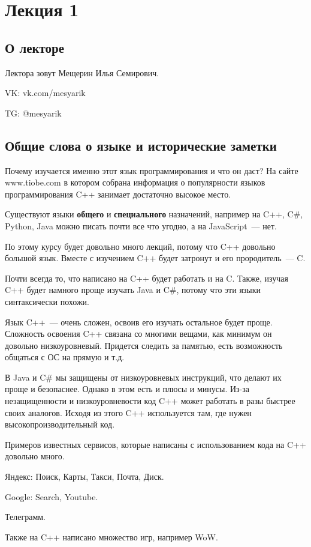 \section{Лекция 1}

\subsection*{О лекторе}
Лектора зовут Мещерин Илья Семирович.

VK: vk.com/mesyarik

TG: @mesyarik

\subsection{Общие слова о языке и исторические заметки}
Почему изучается именно этот язык программирования и что он даст?
На сайте www.tiobe.com в котором собрана информация о популярности языков программирования C++ занимает достаточно высокое место.

Существуют языки \textbf{общего} и \textbf{специального} назначений,
например на C++, C\#, Python, Java можно писать почти все что угодно, а на JavaScript~--- нет.

По этому курсу будет довольно много лекций, потому что C++ довольно большой язык.
Вместе с изучением C++ будет затронут и его прородитель~--- C.

Почти всегда то, что написано на C++ будет работать и на C.
Также, изучая C++ будет намного проще изучать Java и C\#, потому что эти языки синтаксически похожи.

Язык C++~--- очень сложен, освоив его изучать остальное будет проще.
Сложность освоения C++ связана со многими вещами, как минимум он довольно низкоуровневый.
Придется следить за памятью, есть возможность общаться с ОС на прямую и т.д.

В Java и C\# мы защищены от низкоуровневых инструкций, что делают их проще и безопаснее.
Однако в этом есть и плюсы и минусы. Из-за незащищенности и низкоуровневости код C++ может работать в разы быстрее своих аналогов.
Исходя из этого C++ используется там, где нужен высокопроизводительный код.

Примеров известных сервисов, которые написаны с использованием кода на C++ довольно много.

Яндекс: Поиск, Карты, Такси, Почта, Диск.

Google: Search, Youtube.

Телеграмм.

Также на C++ написано множество игр, например WoW.

